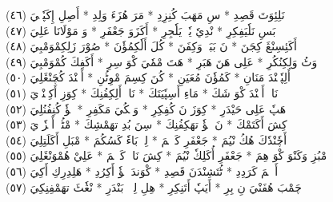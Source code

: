 \documentclass[a4paper, 10pt]{report}
\begin{document}
\begin{center}
\textarabic{(٤٦) \textcolor{mygreen}{نَلِئِوَتَ قَصِدِ  * سِ مَهَبَ كُنِزِدِ  * مَرَ هُزَءَ وَلِدِ  * أَصِلِ إِكَپٗتٖيَ }} 
\\[5mm] 

\textarabic{(٤٧) \textcolor{mygreen}{بَسِ نَلٗيَفِكِرِ  * نْدِيٗ يٗتٖ يَلٗجِرِ  * أَكَزَوَ جَعْفَرِ  * وَ مَوْلَانَا عَلِيَ }} 
\\[5mm] 

\textarabic{(٤٨) \textcolor{mygreen}{أَكَئِسِنْڠَ كِجَنَ  * نَ بَبَكٖ وَكِفَنَ  * كُلَ أَلٗكِمُؤٗنَ  * صُوْرَ زَلِكِمْوَمْبِيَ }} 
\\[5mm] 

\textarabic{(٤٩) \textcolor{mygreen}{وَٹُ وَلِكِنُكُرِ  * عَلِى هَنَ هَبَرِ  * هَتَ مْمٗيَ كْوَ سِرِ  * أَكَفِكَ كُمْوَمْبِيَ }} 
\\[5mm] 

\textarabic{(٥٠) \textcolor{mygreen}{أَلِپٗپٖنْدَ مَنَانِ  * كَمُؤٗنَ مُعَيَنِ  * كُنَ كِسِمَ مْوِٹُنِ  * أَكٖنْدَ كُچَنْڠَلِيَ }} 
\\[5mm] 

\textarabic{(٥١) \textcolor{mygreen}{نَاءٖ أَكٖنْدَ كْوَ شَكَ  * مَاءِ أَسِپٗيَتَكَ  * نَاءٖ أَلِكِفُنِكَ  * كِوَزِ أَكِچٖنْدٖيَ }} 
\\[5mm] 

\textarabic{(٥٢) \textcolor{mygreen}{هَپٗ عَلِى حَيْدَرِ  * كِوَزَ نَ كُفِكِرِ  * وَمٖكُيَ مَكَفِرِ  * يٖؤٗ كُنِفُنُلِيَ }} 
\\[5mm] 

\textarabic{(٥٣) \textcolor{mygreen}{كِشَ أَكَتَمْكَ  * نَ يٖؤٗ تهَكِفُنِكَ  * سِنَ بُدِ تهَمْشِكَ  * مْٹُيٖ أَمٖزٗوٖيَ }} 
\\[5mm] 

\textarabic{(٥٤) \textcolor{mygreen}{أَچٗنْدٗكَ هُكُ نْيُمَ  * جَعْفَرِ كَئٖڠٖمَ  * لِلٖ بَاءٗ كَسُكُمَ  * مْبَلِ أَكَلَتِلِيَ }} 
\\[5mm] 

\textarabic{(٥٥) \textcolor{mygreen}{مْبُزِ وَكَنْوَ كْوَ هِمَ  * جَعْفَرِ أُكَلِكٗ نْيُمَ  * كِشَ نَاءٖ كَئٖڠٖمَ  * عَلِيْ هُمْوَنْڠَلِيَ }} 
\\[5mm] 

\textarabic{(٥٦) \textcolor{mygreen}{أَچٖڠٖمَ كَرَدِدِ  * ٹُتَشِنْدَنَ قَصِدِ  * كْوَندَ يٖؤٗ أَكِرُدِ  * هَلِدِرِكِ أَكِيَ }} 
\\[5mm] 

\textarabic{(٥٧) \textcolor{mygreen}{چَمْبَ هُفَنْيَ نِ بِرِ  * أَيَپٗ أَتَنِكِرِ  * هِلِ لِپٖٹٖ بَنْدَرِ  * نْڠٗٹَ تهَمْفِنِكِيَ }} 
\\[5mm] 


\end{center}
\end{document}
